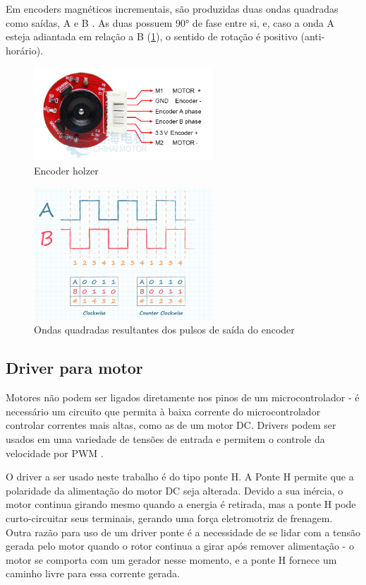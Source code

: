	Em encoders magnéticos incrementais, são produzidas duas ondas quadradas
	como saídas, A e B \cite{encoder_ppr}. As duas possuem 90° de fase entre si,
	e, caso a onda A esteja adiantada em relação a B (\ref{encoder_ppr_ab}),
	o sentido de rotação é positivo (anti-horário).

\begin{figure}[h]
	\centering
	\includegraphics[width=0.6\textwidth]{figures/encoder_holzer}
	\caption{Encoder holzer \cite{motor_dc_6v_encoder}}
\end{figure}

\begin{figure}[h]
	\centering
	\includegraphics[width=0.6\textwidth]{figures/encoder_pulso_ab}
	\caption{Ondas quadradas resultantes dos pulsos de saída do encoder \cite{encoder_ppr}}
	\label{encoder_ppr_ab}
\end{figure}


\subsection{Driver para motor}

	Motores não podem ser ligados diretamente nos pinos de um microcontrolador -
	é necessário um circuito que permita à baixa corrente do microcontrolador
	controlar correntes mais altas, como as de um motor DC. Drivers podem ser
	usados em uma variedade de tensões de entrada e permitem o controle da
	velocidade por PWM \cite{toshiba_ponte_h}.

	O driver a ser usado neste trabalho é do tipo ponte H. A Ponte H permite que
	a polaridade da alimentação do motor DC seja alterada. Devido a sua inércia,
	o motor continua girando mesmo quando a energia é retirada, mas a ponte H
	pode curto-circuitar seus terminais, gerando uma força eletromotriz de
	frenagem. Outra razão para uso de um driver ponte é a necessidade de se lidar
	com a tensão gerada pelo motor quando o rotor continua a girar após remover
	alimentação - o motor se comporta com um gerador nesse momento, e a ponte H
	fornece um caminho livre para essa corrente gerada.



